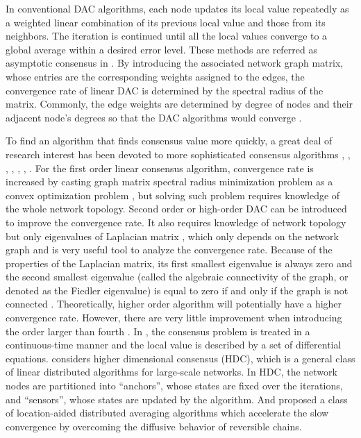 In conventional DAC algorithms, each node updates its local value
repeatedly as a weighted linear combination of its previous local
value and those from its neighbors. The iteration is continued until
all the local values converge to a global average within a desired
error level. These methods are referred as asymptotic consensus in
\cite{Sundaram2007}. By introducing the associated network graph
matrix, whose entries are the corresponding weights assigned to the
edges, the convergence rate of linear DAC is determined by the spectral
radius of the matrix. Commonly, the edge weights are determined by
degree of nodes and their adjacent node's degrees so that the DAC
algorithms would converge \cite{Xiong2009a}. 

To find an algorithm that finds consensus value more quickly, a great
deal of research interest has been devoted to more sophisticated consensus
algorithms \cite{Sundaram2007}, \cite{Xiao2004}, \cite{Moreau2004},
\cite{Khan2010}, \cite{Li2010}, \cite{Kokiopoulou2007}, \cite{Cavalcante2010}.
For the first order linear consensus algorithm, convergence rate is
increased by casting graph matrix spectral radius minimization problem
as a convex optimization problem \cite{Xiao2004}, but solving such
problem requires knowledge of the whole network topology. Second order
or high-order DAC can be introduced to improve the convergence rate.
It also requires knowledge of network topology but only eigenvalues
of Laplacian matrix \cite{Xiong2009a}, which only depends on the
network graph and is very useful tool to analyze the convergence rate.
Because of the properties of the Laplacian matrix, its first smallest
eigenvalue is always zero and the second smallest eigenvalue (called
the algebraic connectivity of the graph, or denoted as the Fiedler
eigenvalue) is equal to zero if and only if the graph is not connected
\cite{MiroslavFiedler1973}\cite{Russell1994}. Theoretically, higher
order algorithm will potentially have a higher convergence rate.\textbf{
}However, there are very little improvement when introducing the order
larger than fourth \cite{Xiong2010}. In \cite{Moreau2004}, the consensus
problem is treated in a continuous-time manner and the local value
is described by a set of differential equations. \cite{Khan2010}
considers higher dimensional consensus (HDC), which is a general class
of linear distributed algorithms for large-scale networks. In HDC,
the network nodes are partitioned into \textquotedblleft{}anchors\textquotedblright{},
whose states are fixed over the iterations, and \textquotedblleft{}sensors\textquotedblright{},
whose states are updated by the algorithm. And \cite{Li2010} proposed
a class of location-aided distributed averaging algorithms which accelerate
the slow convergence by overcoming the diffusive behavior of reversible
chains. 

